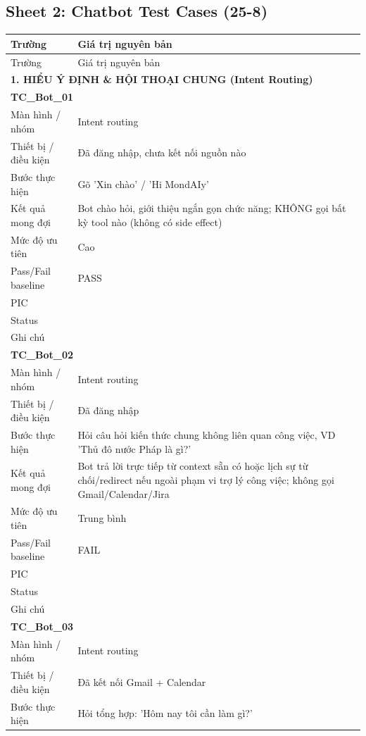 \documentclass[12pt,a4paper]{article}
\begin{document}
\subsection{Sheet 2: Chatbot Test Cases (25-8)}
\begin{longtable}{p{3.0cm}p{11.5cm}}
\toprule Trường & Giá trị nguyên bản \\ \midrule
\endfirsthead
\toprule Trường & Giá trị nguyên bản \\ \midrule
\endhead
\multicolumn{2}{l}{\textbf{1. HIỂU Ý ĐỊNH \& HỘI THOẠI CHUNG (Intent Routing)}} \\ \midrule
\multicolumn{2}{l}{\textbf{TC\_Bot\_01}} \\
Màn hình / nhóm & Intent routing \\
Thiết bị / điều kiện & Đã đăng nhập, chưa kết nối nguồn nào \\
Bước thực hiện & Gõ 'Xin chào' / 'Hi MondAIy' \\
Kết quả mong đợi & Bot chào hỏi, giới thiệu ngắn gọn chức năng; KHÔNG gọi bất kỳ tool nào (không có side effect) \\
Mức độ ưu tiên & Cao \\
Pass/Fail baseline & PASS \\
PIC &  \\
Status &  \\
Ghi chú &  \\
\midrule
\multicolumn{2}{l}{\textbf{TC\_Bot\_02}} \\
Màn hình / nhóm & Intent routing \\
Thiết bị / điều kiện & Đã đăng nhập \\
Bước thực hiện & Hỏi câu hỏi kiến thức chung không liên quan công việc, VD 'Thủ đô nước Pháp là gì?' \\
Kết quả mong đợi & Bot trả lời trực tiếp từ context sẵn có hoặc lịch sự từ chối/redirect nếu ngoài phạm vi trợ lý công việc; không gọi Gmail/Calendar/Jira \\
Mức độ ưu tiên & Trung bình \\
Pass/Fail baseline & FAIL \\
PIC &  \\
Status &  \\
Ghi chú &  \\
\midrule
\multicolumn{2}{l}{\textbf{TC\_Bot\_03}} \\
Màn hình / nhóm & Intent routing \\
Thiết bị / điều kiện & Đã kết nối Gmail + Calendar \\
Bước thực hiện & Hỏi tổng hợp: 'Hôm nay tôi cần làm gì?' \\

\end{longtable}
\end{document}
